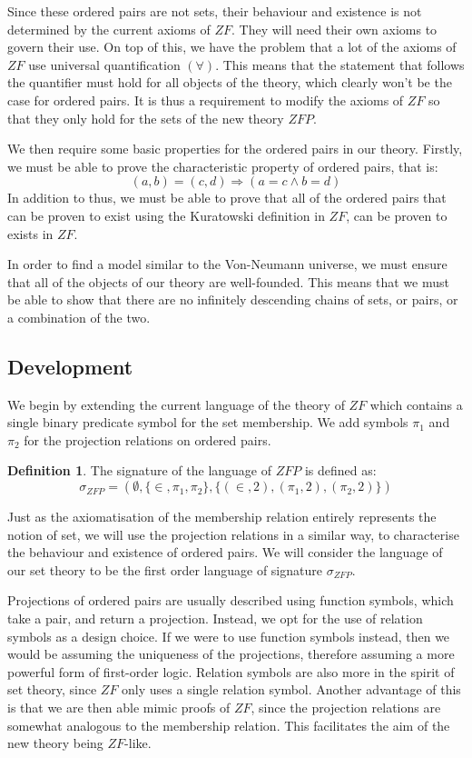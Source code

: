 \documentclass[11pt]{report}
\newcommand{\pleft}{\mathrel{\pi_1}}
\newcommand{\pright}{\mathrel{\pi_2}}
\theoremstyle{definition}
\theoremstyle{theorem}
\theoremstyle{lemma}
\newtheorem{definition}{Definition}[section]
\begin{document}
Since these ordered pairs are not sets, their behaviour and existence is not determined by the current axioms of $\mathit{ZF}$.
They will need their own axioms to govern their use.
On top of this, we have the problem that a lot of the axioms of $\mathit{ZF}$ use universal quantification $(\forall)$.
This means that the statement that follows the quantifier must hold for all objects of the theory, which clearly won't be the case for ordered pairs. 
It is thus a requirement to modify the axioms of $\mathit{ZF}$ so that they only hold for the sets of the new theory $\mathit{ZFP}$. 

We then require some basic properties for the ordered pairs in our theory. 
Firstly, we must be able to prove the characteristic property of ordered pairs, that is:
$$(a,b) = (c,d) \Rightarrow (a = c \wedge b = d)$$
In addition to thus, we must be able to prove that all of the ordered pairs that can be proven to exist using the Kuratowski definition in $\mathit{ZF}$, can be proven to exists in $\mathit{ZF}$.

In order to find a model similar to the Von-Neumann universe, we must ensure that all of the objects of our theory are well-founded. 
This means that we must be able to show that there are no infinitely descending chains of sets, or pairs, or a combination of the two. 
 
\subsection{Development}\label{zfpaxioms}
We begin by extending the current language of the theory of $\mathit{ZF}$ which contains a single binary predicate symbol for the set membership.
We add symbols $\pleft$ and $\pright$ for the projection relations on ordered pairs. 
\begin{definition}
The signature of the language of $\mathit{ZFP}$ is defined as:
$$\sigma_\mathit{ZFP} = (\emptyset,\{\in, \pleft, \pright\},\{(\in,2),(\pleft,2),(\pright,2)\})$$
\end{definition}
\noindent
Just as the axiomatisation of the membership relation entirely represents the notion of set, we will use the projection relations in a similar way, to characterise the behaviour and existence of ordered pairs.
We will consider the language of our set theory to be the first order language of signature $\sigma_\mathit{ZFP}$.

Projections of ordered pairs are usually described using function symbols, which take a pair, and return a projection.
Instead, we opt for the use of relation symbols as a design choice. 
If we were to use function symbols instead, then we would be assuming the uniqueness of the projections, therefore assuming a more powerful form of first-order logic.
Relation symbols are also more in the spirit of set theory, since $\mathit{ZF}$ only uses a single relation symbol. 
Another advantage of this is that we are then able mimic proofs of $\mathit{ZF}$, since the projection relations are somewhat analogous to the membership relation.
This facilitates the aim of the new theory being $\mathit{ZF}$-like.  
\end{document}
